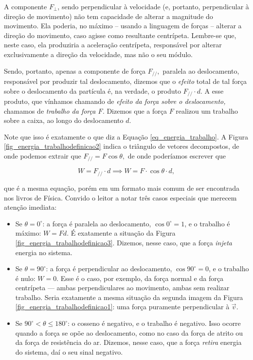 A componente $F_{\perp}$, sendo perpendicular à velocidade (e, portanto, perpendicular à direção de movimento) não tem capacidade de alterar a magnitude do movimento. Ela poderia, no máximo -- usando a linguagem de forças -- alterar a direção do movimento, caso agisse como resultante centrípeta. Lembre-se que, neste caso, ela produziria a aceleração centrípeta, responsável por alterar exclusivamente a direção da velocidade, mas não o seu módulo.

Sendo, portanto, apenas a componente de força $F_{//},$ paralela ao deslocamento, responsável por produzir tal deslocamento, dizemos que o \emph{efeito} total de tal força sobre o deslocamento da partícula é, na verdade, o produto $F_{//} \cdot d.$ A esse produto, que vínhamos chamando de \emph{efeito da força sobre o deslocamento,} chamamos de \textit{trabalho da força $F$.} Dizemos que a força $F$ realizou um trabalho sobre a caixa, ao longo do deslocamento $d.$ 

Note que isso é exatamente o que diz a Equação \eqref{eq_energia_trabalho}. A Figura \ref{fig_energia_trabalhodefinicao2} indica o triângulo de vetores decompostos, de onde podemos extrair que $F_{//} = F \cos \theta,$ de onde poderíamos escrever que 

$$ W = F_{//} \cdot d \implies W = F \cdot \cos \theta \cdot d, $$

\noindent que é a mesma equação, porém em um formato mais comum de ser encontrada nos livros de Física. Convido o leitor a notar três casos especiais que merecem atenção imediata:
 
\begin{itemize}
    \item [(i)] Se $\theta = 0^\circ$: a força é paralela ao deslocamento, $\cos 0^\circ = 1$, e o
    trabalho é máximo: $W = Fd$. É exatamente a situação da Figura \ref{fig_energia_trabalhodefinicao3}. Dizemos, nesse caso, que a força \emph{injeta} energia no sistema.
 
    \item [(ii)] Se $\theta = 90^\circ$: a força é perpendicular ao deslocamento,
    $\cos 90^\circ = 0$, e o trabalho é nulo: $W = 0$. Esse é o caso, por exemplo, da
    força normal e da força centrípeta --- ambas perpendiculares ao movimento, ambas
    sem realizar trabalho. Seria exatamente a mesma situação da segunda imagem da Figura \ref{fig_energia_trabalhodefinicao1}: uma força puramente perpendicular à $\vec v.$
 
    \item [(iii)] Se $90^\circ < \theta \leq 180^\circ$: o cosseno é negativo, e o trabalho é
    negativo. Isso ocorre quando a força se opõe ao deslocamento, como no caso da
    força de atrito ou da força de resistência do ar. Dizemos, nesse caso, que a
    força \textit{retira} energia do sistema, daí o seu sinal negativo.
\end{itemize}




